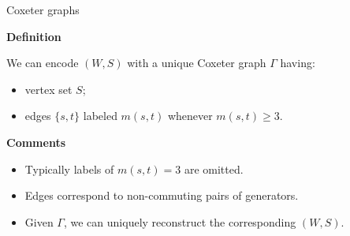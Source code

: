 \documentclass[10pt, compress,aspectratio=169,handout]{beamer}
\begin{document}
\begin{frame}{Coxeter graphs} \pause

\begin{block}{\textbf{Definition}}

\vspace{-.5em}

We can encode $(W,S)$ with a unique \alert{Coxeter graph} $\Gamma$ having: \pause

\vspace{-.5em}

\begin{itemize}
\item vertex set $S$; \pause
\item edges $\{s,t\}$ labeled $m(s,t)$ whenever $m(s,t)\geq 3$.
\end{itemize}
\end{block}

\pause

\begin{block}{\textbf{Comments}}

\begin{itemize}

\vspace{-1em}

\item Typically labels of $m(s,t)=3$ are omitted.

\item Edges correspond to non-commuting pairs of generators.

\item Given $\Gamma$, we can uniquely reconstruct the corresponding $(W,S)$.

\end{itemize}

\end{block}

\end{frame}

\end{document}

